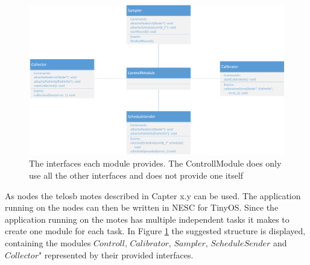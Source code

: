 \begin{figure}[htbp]
	\centering
    \includegraphics[scale=0.6]{content/images/Motes/GeneralStructure}
   	\caption{The interfaces each module provides. The ControllModule does only use all the other interfaces and does not provide one itself}
    \label{fig:moteStructure}
\end{figure}

As nodes the telosb motes described in Capter x.y can be used. The application running on the nodes can then be written in NESC for TinyOS. Since the application running on the motes has multiple independent tasks it makes to create one module for each task. In Figure \ref{fig:moteStructure} the suggested structure is displayed, containing the modules $Controll$, $Calibrator$, $Sampler$, $ScheduleSender$ and $Collector$" represented by their provided interfaces. 

